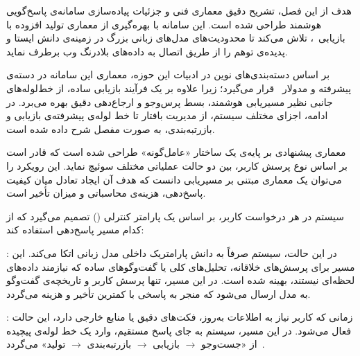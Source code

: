 
هدف از این فصل، تشریح دقیق معماری فنی و جزئیات پیاده‌سازی سامانه‌ی پاسخ‌گویی هوشمند طراحی شده است. این سامانه با بهره‌گیری از معماری تولید افزوده با بازیابی~، تلاش می‌کند تا محدودیت‌های مدل‌های زبانی بزرگ در زمینه‌ی دانش ایستا و پدیده‌ی توهم را از طریق اتصال به داده‌های بلادرنگ وب برطرف نماید. 

بر اساس دسته‌بندی‌های نوین در ادبیات این حوزه، معماری این سامانه در دسته‌ی  پیشرفته و مدولار~ قرار می‌گیرد؛ زیرا علاوه بر یک فرآیند بازیابی ساده، از خط‌لوله‌های جانبی نظیر مسیریابی هوشمند، بسط پرس‌وجو و ارجاع‌دهی دقیق بهره می‌برد. در ادامه، اجزای مختلف سیستم، از مدیریت بافتار تا خط لوله‌ی پیشرفته‌ی بازیابی و بازرتبه‌بندی، به صورت مفصل شرح داده شده است.


معماری پیشنهادی بر پایه‌ی یک ساختار «عامل‌گونه» طراحی شده است که قادر است بر اساس نوع پرسش کاربر، بین دو حالت عملیاتی مختلف سوئیچ نماید. این رویکرد را می‌توان یک معماری مبتنی بر مسیریابی دانست که هدف آن ایجاد تعادل میان کیفیت پاسخ‌دهی، هزینه‌ی محاسباتی و میزان تأخیر است.

سیستم در هر درخواست کاربر، بر اساس یک پارامتر کنترلی () تصمیم می‌گیرد که از کدام مسیر پاسخ‌دهی استفاده کند:


: در این حالت، سیستم صرفاً به دانش پارامتریک داخلی مدل زبانی اتکا می‌کند. این مسیر برای پرسش‌های خلاقانه، تحلیل‌های کلی یا گفت‌وگوهای ساده که نیازمند داده‌های لحظه‌ای نیستند، بهینه شده است. در این مسیر، تنها پرسش کاربر و تاریخچه‌ی گفت‌وگو به مدل ارسال می‌شود که منجر به پاسخی با کمترین تأخیر و هزینه می‌گردد.

: زمانی که کاربر نیاز به اطلاعات به‌روز، فکت‌های دقیق یا منابع خارجی دارد، این حالت فعال می‌شود. در این مسیر، سیستم به جای پاسخ مستقیم، وارد یک خط لوله‌ی پیچیده از «جست‌وجو $\rightarrow$ بازیابی $\rightarrow$ بازرتبه‌بندی $\rightarrow$ تولید» می‌گردد~.


